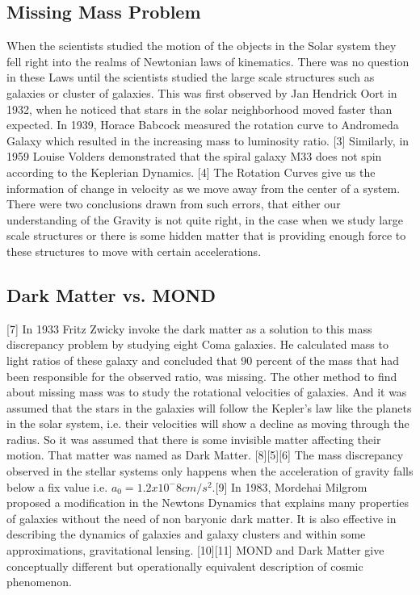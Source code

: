 \documentclass{article}
\begin{document}
\subsection{Missing Mass Problem}
When the scientists studied the motion of the objects in the Solar system they fell right into the realms of Newtonian laws of kinematics. There was no question in these Laws until the scientists studied the large scale structures such as galaxies or cluster of galaxies. This was first observed by Jan Hendrick Oort in 1932, when he noticed that stars in the solar neighborhood moved faster than expected. In 1939, Horace Babcock measured the rotation curve to Andromeda Galaxy which resulted in the increasing mass to luminosity ratio. [3] Similarly, in 1959 Louise Volders demonstrated that the spiral galaxy M33 does not spin according to the Keplerian Dynamics. [4] The Rotation Curves give us the information of change in velocity as we move away from the center of a system. There were two conclusions drawn from such errors, that either our understanding of the Gravity is not quite right, in the case when we study large scale structures or there is some hidden matter that is providing enough force to these structures to move with certain accelerations.

\subsection{Dark Matter vs. MOND}
[7]   In 1933 Fritz Zwicky invoke the dark matter as a solution to this mass discrepancy problem by studying eight Coma galaxies. He calculated mass to light ratios of these galaxy and concluded that 90 percent of the mass that had been responsible for the observed ratio, was missing. The other method to find about missing mass was to study the rotational velocities of galaxies. And it was assumed that the stars in the galaxies will follow the Kepler's law like the planets in the solar system, i.e. their velocities will show a decline as moving through the radius. So it was assumed that there is some invisible matter affecting their motion. That matter was named as Dark Matter.
[8][5][6] The mass discrepancy observed in the stellar systems only happens when the acceleration of gravity falls below a fix value i.e.
$a_{0}= 1.2x10^-8 cm/s^2$.[9] In 1983, Mordehai Milgrom proposed a modification in the Newtons Dynamics that explains many properties of galaxies without  the need of non baryonic dark matter. It is also effective in describing the dynamics of galaxies and galaxy clusters and within some approximations, gravitational lensing. [10][11] MOND and Dark Matter give conceptually different but operationally equivalent description of cosmic phenomenon.
\end{document}
